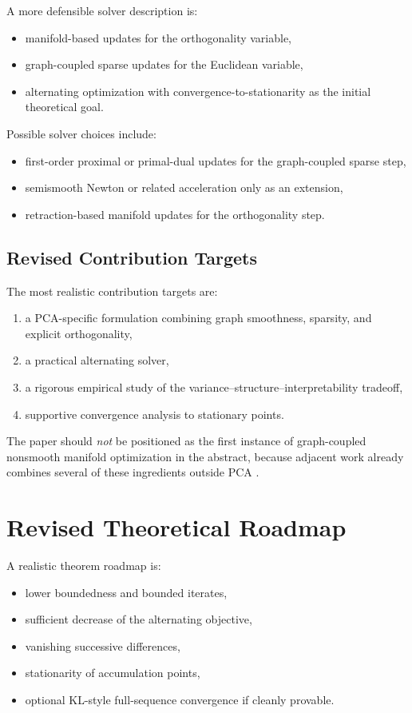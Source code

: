 \documentclass[11pt]{article}
\begin{document}
A more defensible solver description is:
\begin{itemize}
    \item manifold-based updates for the orthogonality variable,
    \item graph-coupled sparse updates for the Euclidean variable,
    \item alternating optimization with convergence-to-stationarity as the initial theoretical goal.
\end{itemize}

Possible solver choices include:
\begin{itemize}
    \item first-order proximal or primal-dual updates for the graph-coupled sparse step,
    \item semismooth Newton or related acceleration only as an extension,
    \item retraction-based manifold updates for the orthogonality step.
\end{itemize}

\subsection{Revised Contribution Targets}

The most realistic contribution targets are:
\begin{enumerate}
    \item a PCA-specific formulation combining graph smoothness, sparsity, and explicit orthogonality,
    \item a practical alternating solver,
    \item a rigorous empirical study of the variance--structure--interpretability tradeoff,
    \item supportive convergence analysis to stationary points.
\end{enumerate}

The paper should \emph{not} be positioned as the first instance of graph-coupled nonsmooth manifold optimization in the abstract, because adjacent work already combines several of these ingredients outside PCA \cite{zhu2025stccal}.

\section{Revised Theoretical Roadmap}

A realistic theorem roadmap is:
\begin{itemize}
    \item lower boundedness and bounded iterates,
    \item sufficient decrease of the alternating objective,
    \item vanishing successive differences,
    \item stationarity of accumulation points,
    \item optional KL-style full-sequence convergence if cleanly provable.
\end{itemize}
\end{document}
